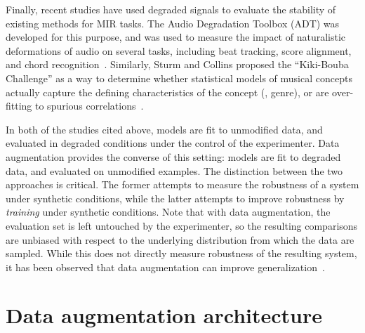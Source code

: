 \documentclass{article}
\begin{document}
%
%
Finally, recent studies have used degraded signals to evaluate the stability of
existing methods for MIR tasks.
The Audio Degradation Toolbox (ADT) was developed for this purpose, and was used
to measure the impact of naturalistic deformations of audio on several tasks, including
beat tracking, score alignment, and chord recognition~\cite{mauch2013audio}.
Similarly, Sturm and Collins proposed the ``Kiki-Bouba Challenge'' as a way to determine
whether statistical models of musical concepts actually capture the defining
characteristics of the concept (\eg, genre), or are over-fitting to spurious
correlations~\cite{sturmkiki}.

In both of the studies cited above, models are fit to unmodified data, and evaluated in
degraded conditions under the control of the experimenter.
Data augmentation provides the converse of this setting: models are fit to degraded data,
and evaluated on unmodified examples.  The distinction between the two approaches is
critical.  The former attempts to measure the robustness of a system under synthetic
conditions, while the latter attempts to improve robustness by \emph{training} under
synthetic conditions. Note that with data augmentation, the evaluation set is left
untouched by the experimenter, so the resulting comparisons are unbiased with respect
to the underlying distribution from which the data are sampled.  While this does not
directly measure robustness of the resulting system, it has been observed  
that data augmentation can improve generalization~\cite{krizhevsky2012imagenet,he2015delving}.


\section{Data augmentation architecture}
\end{document}
